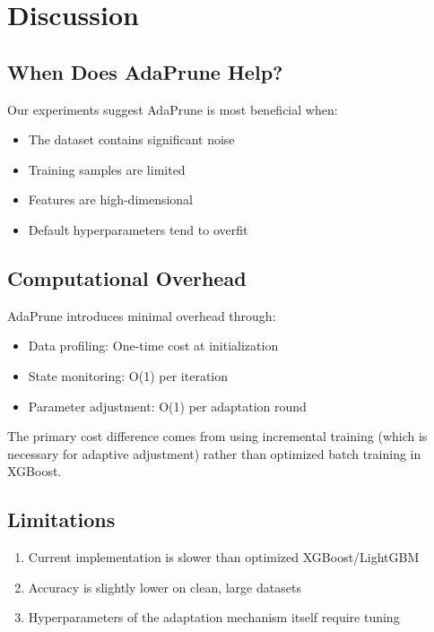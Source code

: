\documentclass[conference]{IEEEtran}
\begin{document}
\section{Discussion}

\subsection{When Does AdaPrune Help?}

Our experiments suggest AdaPrune is most beneficial when:
\begin{itemize}
    \item The dataset contains significant noise
    \item Training samples are limited
    \item Features are high-dimensional
    \item Default hyperparameters tend to overfit
\end{itemize}

\subsection{Computational Overhead}

AdaPrune introduces minimal overhead through:
\begin{itemize}
    \item Data profiling:  One-time cost at initialization
    \item State monitoring: O(1) per iteration
    \item Parameter adjustment: O(1) per adaptation round
\end{itemize}

The primary cost difference comes from using incremental training (which is necessary for adaptive adjustment) rather than optimized batch training in XGBoost. 

\subsection{Limitations}

\begin{enumerate}
    \item Current implementation is slower than optimized XGBoost/LightGBM
    \item Accuracy is slightly lower on clean, large datasets
    \item Hyperparameters of the adaptation mechanism itself require tuning
\end{enumerate}
\end{document}
